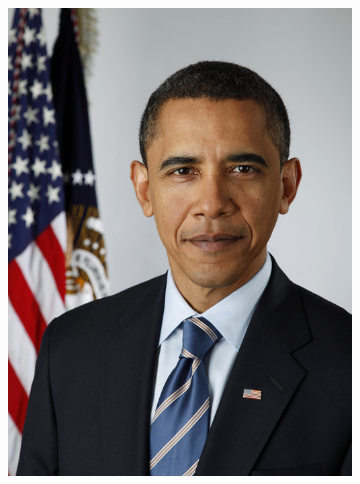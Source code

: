 \documentclass[conference]{IEEEtran}
\begin{document}
					\begin{figure}[!ht]
						\centering
						\begin{subfigure}[!ht]{0.48\linewidth}
							\centerline{\includegraphics[width=0.9\linewidth]{imgs/obama.jpg}}
							\label{fig:1a}
						\end{subfigure}
						\begin{subfigure}[!ht]{0.48\linewidth}

\end{subfigure}
\end{figure}
\end{document}
